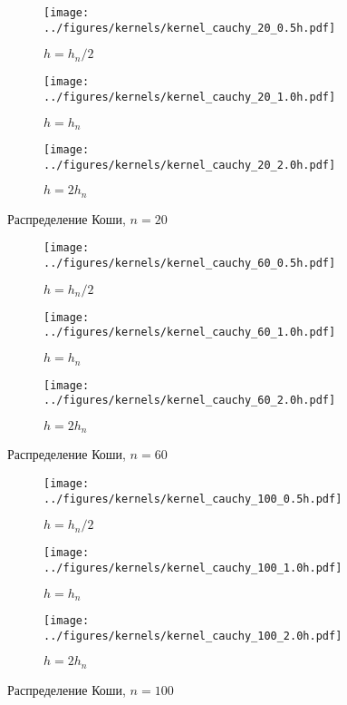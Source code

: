 \documentclass[12pt]{report}
\begin{document}
	\begin{figure}[H]
		\centering
		\begin{subfigure}[t]{.3\linewidth}
			\centering\texttt{[image: ../figures/kernels/kernel\_cauchy\_20\_0.5h.pdf]}
			\caption*{$h = h_n/2$}
		\end{subfigure}
		\begin{subfigure}[t]{.3\linewidth}
			\centering\texttt{[image: ../figures/kernels/kernel\_cauchy\_20\_1.0h.pdf]}
			\caption*{$h = h_n$}
		\end{subfigure}
		\begin{subfigure}[t]{.3\linewidth}
			\centering\texttt{[image: ../figures/kernels/kernel\_cauchy\_20\_2.0h.pdf]}
			\caption*{$h = 2h_n$}
		\end{subfigure}
		\caption{Распределение Коши, $n = 20$}
	\end{figure}
	\begin{figure}[H]
		\centering
		\begin{subfigure}[t]{.3\linewidth}
			\centering\texttt{[image: ../figures/kernels/kernel\_cauchy\_60\_0.5h.pdf]}
			\caption*{$h = h_n/2$}
		\end{subfigure}
		\begin{subfigure}[t]{.3\linewidth}
			\centering\texttt{[image: ../figures/kernels/kernel\_cauchy\_60\_1.0h.pdf]}
			\caption*{$h = h_n$}
		\end{subfigure}
		\begin{subfigure}[t]{.3\linewidth}
			\centering\texttt{[image: ../figures/kernels/kernel\_cauchy\_60\_2.0h.pdf]}
			\caption*{$h = 2h_n$}
		\end{subfigure}
		\caption{Распределение Коши, $n = 60$}
	\end{figure}
	\begin{figure}[H]
		\centering
		\begin{subfigure}[t]{.3\linewidth}
			\centering\texttt{[image: ../figures/kernels/kernel\_cauchy\_100\_0.5h.pdf]}
			\caption*{$h = h_n/2$}
		\end{subfigure}
		\begin{subfigure}[t]{.3\linewidth}
			\centering\texttt{[image: ../figures/kernels/kernel\_cauchy\_100\_1.0h.pdf]}
			\caption*{$h = h_n$}
		\end{subfigure}
		\begin{subfigure}[t]{.3\linewidth}
			\centering\texttt{[image: ../figures/kernels/kernel\_cauchy\_100\_2.0h.pdf]}
			\caption*{$h = 2h_n$}
		\end{subfigure}
		\caption{Распределение Коши, $n = 100$}
	\end{figure}
\end{document}
